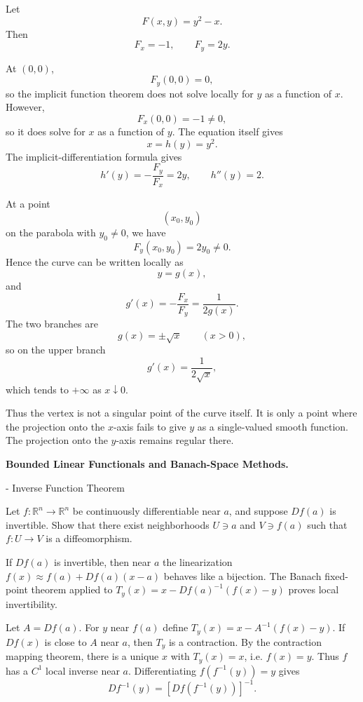 \begin{solution}
Let
\[
F(x,y)=y^2-x.
\]
Then
\[
F_x=-1,\qquad F_y=2y.
\]

At \((0,0)\),
\[
F_y(0,0)=0,
\]
so the implicit function theorem does not solve locally for \(y\) as a function of \(x\).
However,
\[
F_x(0,0)=-1\neq0,
\]
so it does solve for \(x\) as a function of \(y\). The equation itself gives
\[
\boxed{x=h(y)=y^2.}
\]
The implicit-differentiation formula gives
\[
h'(y)
=
-\frac{F_y}{F_x}
=
2y,
\qquad
h''(y)=2.
\]

At a point
\[
(x_0,y_0)
\]
on the parabola with \(y_0\neq0\), we have
\[
F_y(x_0,y_0)=2y_0\neq0.
\]
Hence the curve can be written locally as
\[
y=g(x),
\]
and
\[
g'(x)
=
-\frac{F_x}{F_y}
=
\frac1{2g(x)}.
\]
The two branches are
\[
g(x)=\pm\sqrt x
\qquad(x>0),
\]
so on the upper branch
\[
g'(x)=\frac1{2\sqrt x},
\]
which tends to \(+\infty\) as \(x\downarrow0\).

Thus the vertex is not a singular point of the curve itself. It is only a point where the
projection onto the \(x\)-axis fails to give \(y\) as a single-valued smooth function. The
projection onto the \(y\)-axis remains regular there.
\end{solution}


\begin{problem}[CP-II-0139]
\label{prob:cp-ii-0139}
\textbf{Bounded Linear Functionals and Banach-Space Methods.}

\hspace*{1.5em}- Inverse Function Theorem

Let $f:\mathbb{R}^n\to\mathbb{R}^n$ be continuously differentiable near $a$,
and suppose $Df(a)$ is invertible.
Show that there exist neighborhoods $U\ni a$ and $V\ni f(a)$ such that
$f:U\to V$ is a diffeomorphism.

If $Df(a)$ is invertible, then near $a$ the linearization
$f(x)\approx f(a)+Df(a)(x-a)$ behaves like a bijection.
The Banach fixed-point theorem applied to
$T_y(x)=x-Df(a)^{-1}(f(x)-y)$ proves local invertibility.
\end{problem}

\begin{solution}
Let $A=Df(a)$.  For $y$ near $f(a)$ define $T_y(x)=x-A^{-1}(f(x)-y)$.
If $Df(x)$ is close to $A$ near $a$, then $T_y$ is a contraction.
By the contraction mapping theorem, there is a unique $x$ with $T_y(x)=x$, i.e. $f(x)=y$.
Thus $f$ has a $C^1$ local inverse near $a$.
Differentiating $f(f^{-1}(y))=y$ gives
\[
Df^{-1}(y)=[Df(f^{-1}(y))]^{-1}.
\]
\end{solution}

